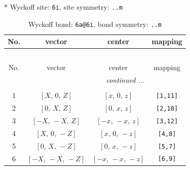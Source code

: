 \documentclass[fleqn,8pt]{jsarticle}
\begin{document}
* Wyckoff site: {\tt 6i}, site symmetry: {\tt ..m}
\renewcommand{\arraystretch}{1.2}
\begin{longtable}{cccc}
\caption{Wyckoff bond: {\tt 6a@6i}, bond symmetry: {\tt ..m}}
 \\
 \hline \hline
No. & vector & center & mapping \\ \hline \endfirsthead

\multicolumn{3}{l}{\tablename\ \thetable{}} \\
 \hline \hline
No. & vector & center & mapping \\ \hline \endhead

 \hline \hline
\multicolumn{3}{r}{\footnotesize\it continued ...} \\ \endfoot

 \hline \hline
\multicolumn{3}{r}{} \\ \endlastfoot

1 & $\left[ X,\, 0,\, Z \right]$ & $\left[ x,\, 0,\, z \right]$ & {\tt [1,11]} \\ \hline
2 & $\left[ 0,\, X,\, Z \right]$ & $\left[ 0,\, x,\, z \right]$ & {\tt [2,10]} \\ \hline
3 & $\left[ - X,\, - X,\, Z \right]$ & $\left[ - x,\, - x,\, z \right]$ & {\tt [3,12]} \\ \hline
4 & $\left[ X,\, 0,\, - Z \right]$ & $\left[ x,\, 0,\, - z \right]$ & {\tt [4,8]} \\ \hline
5 & $\left[ 0,\, X,\, - Z \right]$ & $\left[ 0,\, x,\, - z \right]$ & {\tt [5,7]} \\ \hline
6 & $\left[ - X,\, - X,\, - Z \right]$ & $\left[ - x,\, - x,\, - z \right]$ & {\tt [6,9]} \\
\end{longtable}
\renewcommand{\arraystretch}{1.2}
\end{document}
